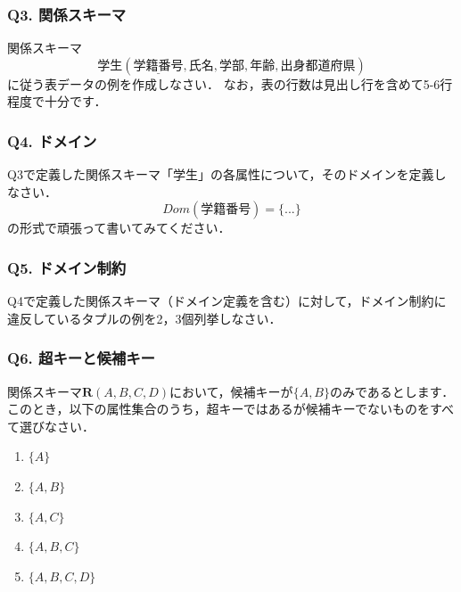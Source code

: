 \subsubsection{Q3. 関係スキーマ}
関係スキーマ
\begin{equation}
\textbf{学生}(\underline{学籍番号}, 氏名, 学部, 年齢, 出身都道府県)
\end{equation}
に従う表データの例を作成しなさい．
なお，表の行数は見出し行を含めて5-6行程度で十分です．


\subsubsection{Q4. ドメイン}
Q3で定義した関係スキーマ「学生」の各属性について，そのドメインを定義しなさい．
\begin{equation}
Dom(学籍番号) = \{ ... \}
\end{equation}
の形式で頑張って書いてみてください．


\subsubsection{Q5. ドメイン制約}
Q4で定義した関係スキーマ（ドメイン定義を含む）に対して，ドメイン制約に違反しているタプルの例を2，3個列挙しなさい．


\subsubsection{Q6. 超キーと候補キー}
関係スキーマ$\boldsymbol{R}(A, B, C, D)$において，候補キーが$\{A, B\}$のみであるとします．
このとき，以下の属性集合のうち，超キーではあるが候補キーでないものをすべて選びなさい．
\begin{enumerate}
    \item $\{A\}$
    \item $\{A, B\}$
    \item $\{A, C\}$
    \item $\{A, B, C\}$
    \item $\{A, B, C, D\}$
\end{enumerate}


